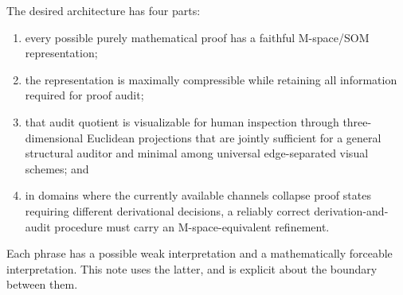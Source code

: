 \documentclass[11pt]{article}
\theoremstyle{plain}
\theoremstyle{definition}
\theoremstyle{remark}
\begin{document}
The desired architecture has four parts:
\begin{enumerate}
    \item every possible purely mathematical proof has a faithful M-space/SOM representation;
    \item the representation is maximally compressible while retaining all information required for proof audit;
    \item that audit quotient is visualizable for human inspection through three-dimensional Euclidean projections that are jointly sufficient for a general structural auditor and minimal among universal edge-separated visual schemes; and
    \item in domains where the currently available channels collapse proof states requiring different derivational decisions, a reliably correct derivation-and-audit procedure must carry an M-space-equivalent refinement.
\end{enumerate}

Each phrase has a possible weak interpretation and a mathematically forceable interpretation.  This note uses the latter, and is explicit about the boundary between them.
\end{document}
